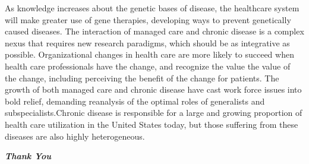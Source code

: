 \documentclass[12pt]{article}
\begin{document}
As knowledge increases about the genetic bases of disease, the healthcare system will make greater use of gene therapies, developing ways to prevent genetically caused diseases. The interaction of managed care and chronic disease is a complex nexus that requires new research paradigms, which should be as integrative as possible. Organizational changes in health care are more likely to succeed when health care professionals have the change, and recognize the value the value of the change, including perceiving the benefit of the change for patients.\newpage
The growth of both managed care and chronic disease have cast work force issues into bold relief, demanding reanalysis of the optimal roles of generalists and subspecialists.Chronic disease is responsible for a large and growing proportion of health care utilization in the United States today, but those suffering from these diseases are also highly heterogeneous.
 \newline\newline\newline\newline\newline\newline\newline\newline\newline\newline\newline
\begin{center}
\textbf{\textsl{\textsl{Thank You}}}
\end{center}
\end{document}
